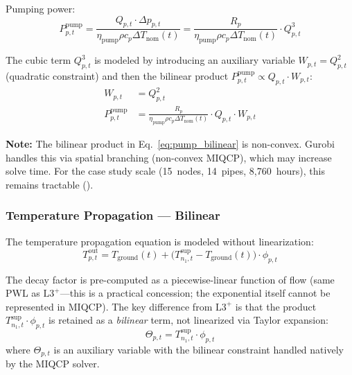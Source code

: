\documentclass[review,3p]{elsarticle}
\newcommand{\Lplus}{\mathrm{L3}^{+}}
\begin{document}
Pumping power:
\begin{equation}
P_{p,t}^{\mathrm{pump}} = \frac{Q_{p,t}
\cdot \Delta p_{p,t}}{\eta_{\mathrm{pump}} \rho
c_p \Delta T_{\mathrm{nom}}(t)}
= \frac{R_p}{\eta_{\mathrm{pump}} \rho c_p
\Delta T_{\mathrm{nom}}(t)} \cdot Q_{p,t}^3
\label{eq:pump_power_quad}
\end{equation}

The cubic term $Q_{p,t}^3$ is modeled by introducing an auxiliary
variable $W_{p,t} = Q_{p,t}^2$ (quadratic constraint) and then
the bilinear product $P_{p,t}^{\mathrm{pump}} \propto Q_{p,t}
\cdot W_{p,t}$:
\begin{align}
W_{p,t} &= Q_{p,t}^2
\label{eq:aux_quad} \\
P_{p,t}^{\mathrm{pump}} &= \frac{R_p}{\eta_{\mathrm{pump}} \rho
c_p \Delta T_{\mathrm{nom}}(t)} \cdot Q_{p,t} \cdot W_{p,t}
\label{eq:pump_bilinear}
\end{align}

\textbf{Note:} The bilinear product in Eq.~\eqref{eq:pump_bilinear}
is non-convex. Gurobi handles this via spatial branching
(non-convex MIQCP), which may increase solve time. For the case
study scale (15~nodes, 14~pipes, 8,760~hours), this remains
tractable ().

\subsubsection{Temperature Propagation --- Bilinear}

The temperature propagation equation is modeled without
linearization:
\begin{equation}
T_{p,t}^{\mathrm{out}} = T_{\mathrm{ground}}(t)
+ \big(T_{n_1,t}^{\mathrm{sup}} - T_{\mathrm{ground}}(t)\big)
\cdot \phi_{p,t}
\label{eq:temp_prop_quad}
\end{equation}

The decay factor is pre-computed as a piecewise-linear function of
flow (same PWL as $\Lplus$---this is a practical concession; the
exponential itself cannot be represented in MIQCP). The key
difference from $\Lplus$ is that the product
$T_{n_1,t}^{\mathrm{sup}} \cdot \phi_{p,t}$ is retained as a
\emph{bilinear} term, not linearized via Taylor expansion:
\begin{equation}
\Theta_{p,t} = T_{n_1,t}^{\mathrm{sup}} \cdot \phi_{p,t}
\label{eq:bilinear_temp}
\end{equation}
where $\Theta_{p,t}$ is an auxiliary variable with the bilinear
constraint handled natively by the MIQCP solver.
\end{document}
